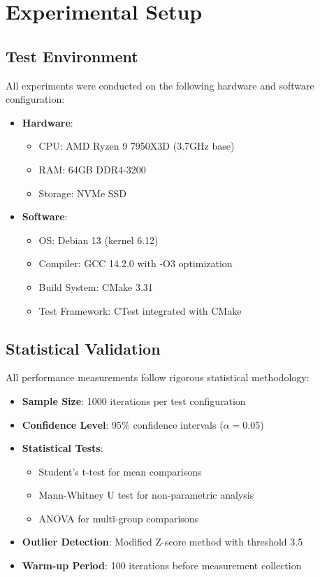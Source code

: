\documentclass[11pt,a4paper]{article}
\begin{document}
\section{Experimental Setup}

\subsection{Test Environment}

All experiments were conducted on the following hardware and software configuration:

\begin{itemize}
\item \textbf{Hardware}: 
  \begin{itemize}
  \item CPU: AMD Ryzen 9 7950X3D (3.7GHz base)
  \item RAM: 64GB DDR4-3200
  \item Storage: NVMe SSD
  \end{itemize}
\item \textbf{Software}:
  \begin{itemize}
  \item OS: Debian 13 (kernel 6.12)
  \item Compiler: GCC 14.2.0 with -O3 optimization
  \item Build System: CMake 3.31
  \item Test Framework: CTest integrated with CMake
  \end{itemize}
\end{itemize}

\subsection{Statistical Validation}

All performance measurements follow rigorous statistical methodology:

\begin{itemize}
\item \textbf{Sample Size}: 1000 iterations per test configuration
\item \textbf{Confidence Level}: 95\% confidence intervals ($\alpha = 0.05$)
\item \textbf{Statistical Tests}: 
  \begin{itemize}
  \item Student's t-test for mean comparisons
  \item Mann-Whitney U test for non-parametric analysis
  \item ANOVA for multi-group comparisons
  \end{itemize}
\item \textbf{Outlier Detection}: Modified Z-score method with threshold 3.5
\item \textbf{Warm-up Period}: 100 iterations before measurement collection
\end{itemize}
\end{document}
